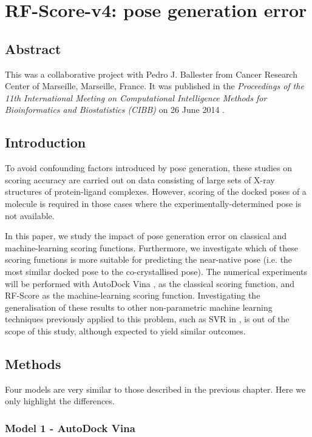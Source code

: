 \chapter{RF-Score-v4: pose generation error}

\section{Abstract}

This was a collaborative project with Pedro J. Ballester from Cancer Research Center of Marseille, Marseille, France. It was published in the \textit{Proceedings of the 11th International Meeting on Computational Intelligence Methods for Bioinformatics and Biostatistics (CIBB)} on 26 June 2014 \citep{1434}.

\section{Introduction}

To avoid confounding factors introduced by pose generation, these studies on scoring accuracy are carried out on data consisting of large sets of X-ray structures of protein-ligand complexes. However, scoring of the docked poses of a molecule is required in those cases where the experimentally-determined pose is not available.

In this paper, we study the impact of pose generation error on classical and machine-learning scoring functions. Furthermore, we investigate which of these scoring functions is more suitable for predicting the near-native pose (i.e. the most similar docked pose to the co-crystallised pose). The numerical experiments will be performed with AutoDock Vina \citep{595}, as the classical scoring function, and RF-Score \citep{564} as the machine-learning scoring function. Investigating the generalisation of these results to other non-parametric machine learning techniques previously applied to this problem, such as SVR in \citep{1295}, is out of the scope of this study, although expected to yield similar outcomes.

\section{Methods}

Four models are very similar to those described in the previous chapter. Here we only highlight the differences.

\subsection{Model 1 - AutoDock Vina}

